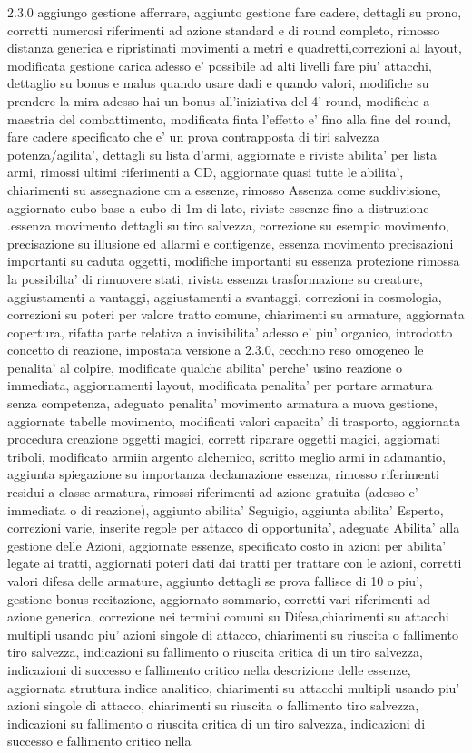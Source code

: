 \documentclass[a4paper,11pt,twoside,openany]{book}
\begin{document}
{{			2.3.0 aggiungo gestione afferrare, aggiunto gestione fare cadere, dettagli su prono, corretti numerosi riferimenti ad azione standard e di round completo, rimosso distanza generica e ripristinati movimenti a metri e quadretti,correzioni al layout, modificata gestione carica adesso e' possibile ad alti livelli fare piu' attacchi, dettaglio su bonus e malus quando usare dadi e quando valori, modifiche su prendere la mira adesso hai un bonus all'iniziativa del 4' round, modifiche a maestria del combattimento, modificata finta l'effetto e' fino alla fine del round, fare cadere specificato che e' un prova contrapposta di tiri salvezza potenza/agilita', dettagli su lista d'armi, aggiornate e riviste abilita' per lista armi, rimossi ultimi riferimenti a CD, aggiornate quasi tutte le abilita', chiarimenti su assegnazione cm a essenze, rimosso Assenza come suddivisione, aggiornato cubo base a cubo di 1m di lato, riviste essenze fino a distruzione .essenza movimento dettagli su tiro salvezza, correzione su esempio movimento, precisazione su illusione ed allarmi e contigenze, essenza movimento precisazioni importanti su caduta oggetti, modifiche importanti su essenza protezione rimossa la possibilta' di rimuovere stati, rivista essenza trasformazione su creature, aggiustamenti a vantaggi, aggiustamenti a svantaggi, correzioni in cosmologia, correzioni su poteri per valore tratto comune, chiarimenti su armature, aggiornata copertura, rifatta parte relativa a invisibilita' adesso e' piu' organico, introdotto concetto di reazione, impostata versione a 2.3.0, cecchino reso omogeneo le penalita' al colpire, modificate qualche abilita' perche' usino reazione o immediata, aggiornamenti layout, modificata penalita' per portare armatura senza competenza, adeguato penalita' movimento armatura a nuova gestione, aggiornate tabelle movimento, modificati valori capacita' di trasporto, aggiornata procedura creazione oggetti magici, corrett riparare oggetti magici, aggiornati triboli, modificato armiin argento alchemico, scritto meglio armi in adamantio, aggiunta spiegazione su importanza declamazione essenza, rimosso riferimenti residui a classe armatura, rimossi riferimenti ad azione gratuita (adesso e' immediata o di reazione), aggiunto abilita' Seguigio, aggiunta abilita' Esperto, correzioni varie, inserite regole per attacco di opportunita', adeguate Abilita' alla gestione delle Azioni, aggiornate essenze, specificato costo in azioni per abilita' legate ai tratti, aggiornati poteri dati dai tratti per trattare con le azioni, corretti valori difesa delle armature, aggiunto dettagli se prova fallisce di 10 o piu', gestione bonus recitazione, aggiornato sommario, corretti vari riferimenti ad azione generica, correzione nei termini comuni su Difesa,chiarimenti su attacchi multipli usando piu' azioni singole di attacco, chiarimenti su riuscita o fallimento tiro salvezza, indicazioni su fallimento o riuscita critica di un tiro salvezza, indicazioni di successo e fallimento critico nella descrizione delle essenze, aggiornata struttura indice analitico, chiarimenti su attacchi multipli usando piu' azioni singole di attacco, chiarimenti su riuscita o fallimento tiro salvezza, indicazioni su fallimento o riuscita critica di un tiro salvezza, indicazioni di successo e fallimento critico nella }}
\end{document}
